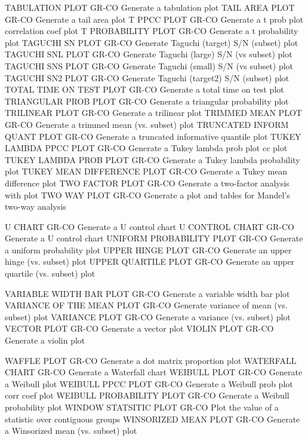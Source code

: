 TABULATION PLOT             GR-CO Generate a tabulation plot
TAIL AREA PLOT              GR-CO Generate a tail area plot
T PPCC PLOT                 GR-CO Generate a t prob plot correlation coef plot
T PROBABILITY PLOT          GR-CO Generate a t probability plot
TAGUCHI SN PLOT             GR-CO Generate Taguchi (target) S/N (subset) plot
TAGUCHI SNL PLOT            GR-CO Generate Taguchi (large) S/N (vs subset) plot
TAGUCHI SNS PLOT            GR-CO Generate Taguchi (small) S/N (vs subset) plot
TAGUCHI SN2 PLOT            GR-CO Generate Taguchi (target2) S/N (subset) plot
TOTAL TIME ON TEST PLOT     GR-CO Generate a total time on test plot
TRIANGULAR PROB PLOT        GR-CO Generate a triangular probability plot
TRILINEAR PLOT              GR-CO Generate a trilinear plot
TRIMMED MEAN PLOT           GR-CO Generate a trimmed mean (vs. subset) plot
TRUNCATED INFORM QUANT PLOT GR-CO Generate a truncated informative quantile plot
TUKEY LAMBDA PPCC PLOT      GR-CO Generate a Tukey lambda prob plot cc plot
TUKEY LAMBDA PROB PLOT      GR-CO Generate a Tukey lambda probability plot
TUKEY MEAN DIFFERENCE PLOT  GR-CO Generate a Tukey mean difference plot
TWO FACTOR PLOT             GR-CO Generate a two-factor analysis with plot
TWO WAY PLOT                GR-CO Generate a plot and tables for Mandel's two-way analysis

U CHART                     GR-CO Generate a U control chart
U CONTROL CHART             GR-CO Generate a U control chart
UNIFORM PROBABILITY PLOT    GR-CO Generate a uniform probability plot
UPPER HINGE PLOT            GR-CO Generate an upper hinge (vs. subset) plot
UPPER QUARTILE PLOT         GR-CO Generate an upper quartile (vs. subset) plot

VARIABLE WIDTH BAR PLOT     GR-CO Generate a variable width bar plot
VARIANCE OF THE MEAN PLOT   GR-CO Generate variance of mean (vs. subset) plot
VARIANCE PLOT               GR-CO Generate a variance (vs. subset) plot
VECTOR PLOT                 GR-CO Generate a vector plot
VIOLIN PLOT                 GR-CO Generate a violin plot

WAFFLE PLOT                 GR-CO Generate a dot matrix proportion plot
WATERFALL CHART             GR-CO Generate a Waterfall chart
WEIBULL PLOT                GR-CO Generate a Weibull plot
WEIBULL PPCC PLOT           GR-CO Generate a Weibull prob plot corr coef plot
WEIBULL PROBABILITY PLOT    GR-CO Generate a Weibull probability plot
WINDOW STATSITIC PLOT       GR-CO Plot the value of a statistic over contiguous groups
WINSORIZED MEAN PLOT        GR-CO Generate a Winsorized mean (vs. subset) plot

